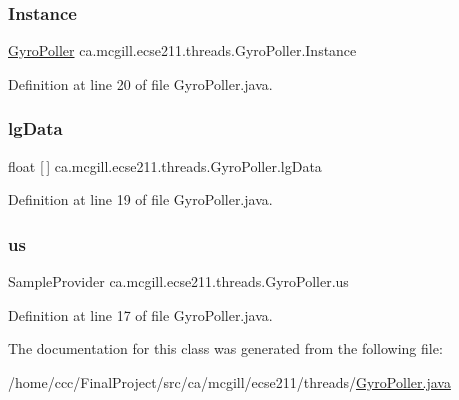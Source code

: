 \subsubsection{\texorpdfstring{Instance}{Instance}}
{\footnotesize\ttfamily \hyperlink{classca_1_1mcgill_1_1ecse211_1_1threads_1_1_gyro_poller}{Gyro\+Poller} ca.\+mcgill.\+ecse211.\+threads.\+Gyro\+Poller.\+Instance}



Definition at line 20 of file Gyro\+Poller.\+java.

\mbox{\label{classca_1_1mcgill_1_1ecse211_1_1threads_1_1_gyro_poller_a112e433b3561e89927357051f55f8cf1}} 
\subsubsection{\texorpdfstring{lg\+Data}{lgData}}
{\footnotesize\ttfamily float \mbox{[}$\,$\mbox{]} ca.\+mcgill.\+ecse211.\+threads.\+Gyro\+Poller.\+lg\+Data\hspace{0.3cm}{\ttfamily [protected]}}



Definition at line 19 of file Gyro\+Poller.\+java.

\mbox{\label{classca_1_1mcgill_1_1ecse211_1_1threads_1_1_gyro_poller_af478329ec7a335a4f3d2d412d5d10091}} 
\subsubsection{\texorpdfstring{us}{us}}
{\footnotesize\ttfamily Sample\+Provider ca.\+mcgill.\+ecse211.\+threads.\+Gyro\+Poller.\+us\hspace{0.3cm}{\ttfamily [protected]}}



Definition at line 17 of file Gyro\+Poller.\+java.



The documentation for this class was generated from the following file\+:\begin{DoxyCompactItemize}
\item 
/home/ccc/\+Final\+Project/src/ca/mcgill/ecse211/threads/\hyperlink{_gyro_poller_8java}{Gyro\+Poller.\+java}\end{DoxyCompactItemize}
